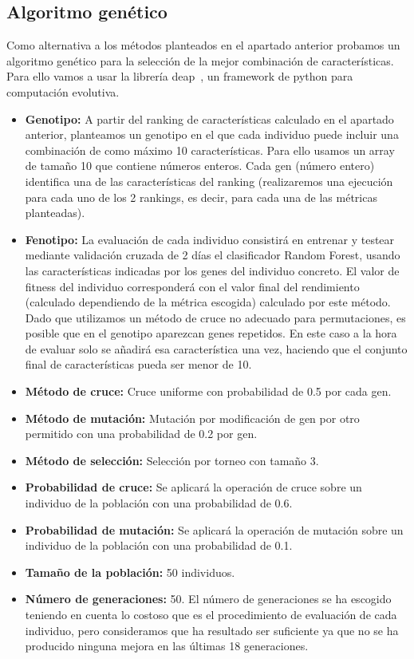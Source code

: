 \documentclass[a4paper,12pt,twoside,oldfontcommands]{memoir}
\begin{document}
\subsection{Algoritmo genético}
Como alternativa a los métodos planteados en el apartado anterior probamos un algoritmo genético para la selección de la mejor combinación de características. Para ello vamos a usar la librería  deap~\cite{DEAP_JMLR2012}, un framework de python para computación evolutiva. 


\begin{itemize}
    \item \textbf{Genotipo:} A partir del ranking de características calculado en el apartado anterior, planteamos un genotipo en el que cada individuo puede incluir una combinación de como máximo 10 características. Para ello usamos un array de tamaño 10 que contiene números enteros. Cada gen (número entero) identifica una de las características del ranking (realizaremos una ejecución para cada uno de los 2 rankings, es decir, para cada una de las métricas planteadas). 
    \item \textbf{Fenotipo:} La evaluación de cada individuo consistirá en entrenar y testear mediante validación cruzada de 2 días el clasificador Random Forest, usando las características indicadas por los genes del individuo concreto. El valor de fitness del individuo corresponderá con el valor final del rendimiento (calculado dependiendo de la métrica escogida) calculado por este método. Dado que utilizamos un método de cruce no adecuado para permutaciones, es posible que en el genotipo aparezcan genes repetidos. En este caso a la hora de evaluar solo se añadirá esa característica una vez, haciendo que el conjunto final de características pueda ser menor de 10. 
    \item \textbf{Método de cruce:} Cruce uniforme con probabilidad de 0.5 por cada gen. 
    \item \textbf{Método de mutación:} Mutación por modificación de gen por otro permitido con una probabilidad de 0.2 por gen.
    \item \textbf{Método de selección: } Selección por torneo con tamaño 3. 
    \item \textbf{Probabilidad de cruce:} Se aplicará la operación de cruce sobre un individuo de la población con una probabilidad de 0.6. 
    \item \textbf{Probabilidad de mutación:} Se aplicará la operación de mutación sobre un individuo de la población con una probabilidad de 0.1. 
    \item \textbf{Tamaño de la población: } 50 individuos. 
    \item \textbf{Número de generaciones: } 50. El número de generaciones se ha escogido teniendo en cuenta lo costoso que es el procedimiento de evaluación de cada individuo, pero consideramos que ha resultado ser suficiente ya que no se ha producido ninguna mejora en las últimas 18 generaciones. 
\end{itemize}
\end{document}
